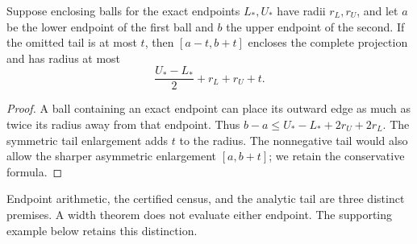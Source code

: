 \begin{corollary}\label{cor:range-arithmetic}
Suppose enclosing balls for the exact endpoints $L_*,U_*$ have radii
$r_L,r_U$, and let $a$ be the lower endpoint of the first ball and $b$
the upper endpoint of the second. If the omitted tail is at most $t$,
then $[a-t,b+t]$ encloses the complete projection and has radius at most
\begin{equation}\label{eq:range-total}
 \frac{U_*-L_*}{2}+r_L+r_U+t.
\end{equation}
\end{corollary}
\begin{proof}
A ball containing an exact endpoint can place its outward edge as much
as twice its radius away from that endpoint. Thus
$b-a\le U_*-L_*+2r_U+2r_L$. The symmetric tail enlargement adds $t$
to the radius. The nonnegative tail would also allow the sharper
asymmetric enlargement $[a,b+t]$; we retain the conservative formula.
\end{proof}
Endpoint arithmetic, the certified census, and the analytic tail are
three distinct premises. A width theorem does not evaluate either
endpoint. The supporting example below retains this distinction.
